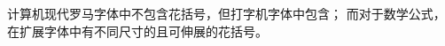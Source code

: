 \documentclass[letterpaper]{book}
\begin{document}
计算机现代罗马字体中不包含花括号，但打字机字体中包含；
而对于数学公式，在扩展字体中有不同尺寸的\ldash 且可伸展的\rdash 花括号。

\endofchapter
\end{document}
